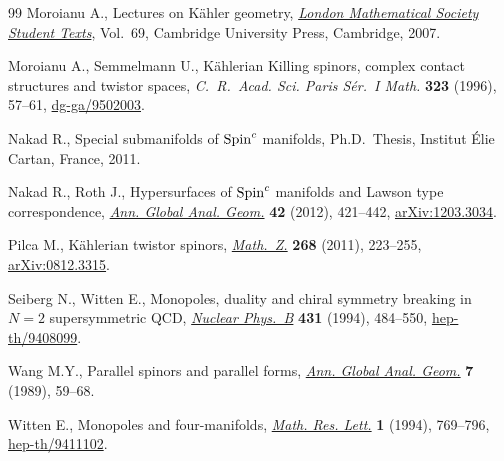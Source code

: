 \documentclass[10pt,a4paper]{amsart}
\numberwithin{equation}{section}
\theoremstyle{definition}
\begin{document}
\begin{thebibliography}{99}
Moroianu A., Lectures on {K}\"ahler geometry, \href{http://dx.doi.org/10.1017/CBO9780511618666}{\textit{London Mathematical
  Society Student Texts}}, Vol.~69, Cambridge University Press, Cambridge, 2007.

Moroianu A., Semmelmann U., K\"ahlerian {K}illing spinors, complex contact
  structures and twistor spaces, \textit{C.~R.~Acad. Sci. Paris S\'er.~I Math.}
  \textbf{323} (1996), 57--61, \href{http://arxiv.org/abs/dg-ga/9502003}{dg-ga/9502003}.

Nakad R., Special submanifolds of {${\rm Spin}^c$} manifolds, Ph.D.~Thesis,
  Institut \'Elie Cartan, France, 2011.

Nakad R., Roth J., Hypersurfaces of {${\rm Spin}^c$} manifolds and {L}awson
  type correspondence, \href{http://dx.doi.org/10.1007/s10455-012-9321-5}{\textit{Ann. Global Anal. Geom.}} \textbf{42} (2012),
  421--442, \href{http://arxiv.org/abs/1203.3034}{arXiv:1203.3034}.

Pilca M., K\"ahlerian twistor spinors, \href{http://dx.doi.org/10.1007/s00209-010-0668-7}{\textit{Math.~Z.}} \textbf{268} (2011),
  223--255, \href{http://arxiv.org/abs/0812.3315}{arXiv:0812.3315}.

Seiberg N., Witten E., Monopoles, duality and chiral symmetry breaking in
  {$N=2$} supersymmetric {QCD}, \href{http://dx.doi.org/10.1016/0550-3213(94)90214-3}{\textit{Nuclear Phys.~B}} \textbf{431} (1994),
  484--550, \href{http://arxiv.org/abs/hep-th/9408099}{hep-th/9408099}.

Wang M.Y., Parallel spinors and parallel forms, \href{http://dx.doi.org/10.1007/BF00137402}{\textit{Ann. Global Anal.
  Geom.}} \textbf{7} (1989), 59--68.

Witten E., Monopoles and four-manifolds, \href{http://dx.doi.org/10.4310/MRL.1994.v1.n6.a13}{\textit{Math. Res. Lett.}} \textbf{1}
  (1994), 769--796, \href{http://arxiv.org/abs/hep-th/9411102}{hep-th/9411102}.

\end{thebibliography}
\end{document}
